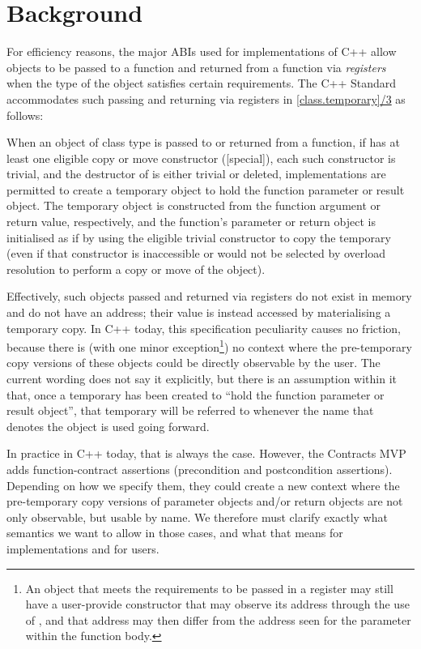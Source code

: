 \section{Background}
\label{bg}

For efficiency reasons, the major ABIs used for implementations of C++ allow objects to be passed to a function and returned from a function via \emph{registers} when the type of the object satisfies certain requirements. The C++ Standard accommodates such passing and returning via registers in \href{https://timsong-cpp.github.io/cppwp/n4950/class.temporary#3}{[class.temporary]/3} as follows:

\begin{adjustwidth}{0.5cm}{0.5cm}
When an object of class type  is passed to or returned from a function, if  has at least one eligible copy or move constructor ([special]), each such constructor is trivial, and the destructor of  is either trivial or deleted, implementations are permitted to create a temporary object to hold the function parameter or result object. The temporary object is constructed from the function argument or return value, respectively, and the function's parameter or return object is initialised as if by using the eligible trivial constructor to copy the temporary (even if that constructor is inaccessible or would not be selected by overload resolution to perform a copy or move of the object).
\end{adjustwidth}

Effectively, such objects passed and returned via registers do not exist in memory and do not have an address; their value is instead accessed by materialising a temporary copy. In C++ today, this specification peculiarity causes no friction, because there is (with one minor exception\footnote{An object that meets the requirements to be passed in a register may still have a user-provide constructor that may observe its address through the use of , and that address may then differ from the address seen for the parameter within the function body.}) no context where the pre-temporary copy versions of these objects could be directly observable by the user. 
The current wording does not say it explicitly, but there is an assumption within it that, once a temporary has been created to ``hold the function parameter or result object'', that temporary will be referred to whenever the name that denotes the object is used going forward.

In practice in C++ today, that is always the case. However, the Contracts MVP \cite{P2900R10} adds function-contract assertions (precondition and postcondition assertions). Depending on how we specify them, they could create a new context where the pre-temporary copy versions of  parameter objects and/or return objects are not only observable, but usable by name. We therefore must clarify exactly what semantics we want to allow in those cases, and what that means for implementations and for users.

